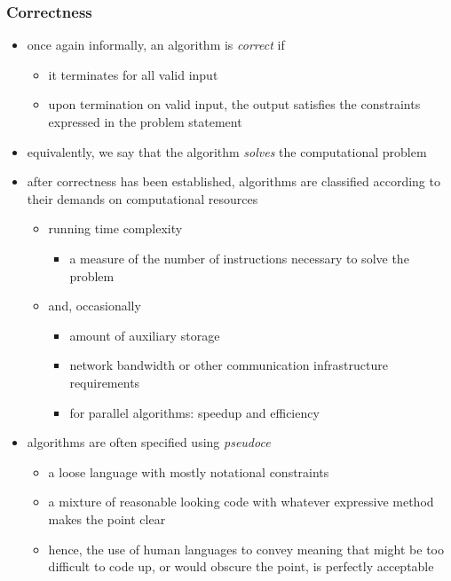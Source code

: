 \begin{frame}[fragile]
%
  \frametitle{Correctness}
%
  \begin{itemize}
%
  \item once again informally, an algorithm is {\em correct} if
    \begin{itemize}
    \item it terminates for all valid input
    \item upon termination on valid input, the output satisfies the constraints expressed in
      the problem statement
    \end{itemize}
%
  \item equivalently, we say that the algorithm {\em solves} the computational problem
%
  \item after correctness has been established, algorithms are classified according to their
    demands on computational resources
    \begin{itemize}
    \item running time complexity
      \begin{itemize}
      \item a measure of the number of instructions necessary to solve the problem
      \end{itemize}
    \item and, occasionally
      \begin{itemize}
      \item amount of auxiliary storage
      \item network bandwidth or other communication infrastructure requirements
      \item for parallel algorithms: speedup and efficiency
      \end{itemize}
    \end{itemize}
%
  \item algorithms are often specified using {\em pseudoce}
    \begin{itemize}
      \item a loose language with mostly notational constraints
      \item a mixture of reasonable looking code with whatever expressive method  makes the
        point clear
      \item hence, the use of human languages to convey meaning that might be too difficult to
        code up, or would obscure the point, is perfectly acceptable
    \end{itemize}
%
  \end{itemize}
%
\end{frame}



